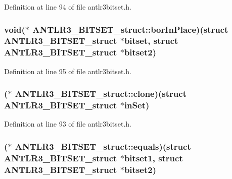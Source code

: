 Definition at line 94 of file antlr3bitset.\-h.

\hypertarget{struct_a_n_t_l_r3___b_i_t_s_e_t__struct_a4354623d1e7f563c84a8ad2c6839db25}{
\subsubsection[{bor\-In\-Place}]{\setlength{\rightskip}{0pt plus 5cm}void($\ast$ A\-N\-T\-L\-R3\-\_\-\-B\-I\-T\-S\-E\-T\-\_\-struct\-::bor\-In\-Place)(struct {\bf A\-N\-T\-L\-R3\-\_\-\-B\-I\-T\-S\-E\-T\-\_\-struct} $\ast$bitset, struct {\bf A\-N\-T\-L\-R3\-\_\-\-B\-I\-T\-S\-E\-T\-\_\-struct} $\ast$bitset2)}}\label{struct_a_n_t_l_r3___b_i_t_s_e_t__struct_a4354623d1e7f563c84a8ad2c6839db25}


Definition at line 95 of file antlr3bitset.\-h.

\hypertarget{struct_a_n_t_l_r3___b_i_t_s_e_t__struct_a2285d8dc3d04b4eae8986908897a86f4}{
\subsubsection[{clone}]{($\ast$ A\-N\-T\-L\-R3\-\_\-\-B\-I\-T\-S\-E\-T\-\_\-struct\-::clone)(struct {\bf A\-N\-T\-L\-R3\-\_\-\-B\-I\-T\-S\-E\-T\-\_\-struct} $\ast$in\-Set)}}\label{struct_a_n_t_l_r3___b_i_t_s_e_t__struct_a2285d8dc3d04b4eae8986908897a86f4}


Definition at line 93 of file antlr3bitset.\-h.

\hypertarget{struct_a_n_t_l_r3___b_i_t_s_e_t__struct_a94e3dc61f3da71dadfc19c1b31981134}{
\subsubsection[{equals}]{($\ast$ A\-N\-T\-L\-R3\-\_\-\-B\-I\-T\-S\-E\-T\-\_\-struct\-::equals)(struct {\bf A\-N\-T\-L\-R3\-\_\-\-B\-I\-T\-S\-E\-T\-\_\-struct} $\ast$bitset1, struct {\bf A\-N\-T\-L\-R3\-\_\-\-B\-I\-T\-S\-E\-T\-\_\-struct} $\ast$bitset2)}}\label{struct_a_n_t_l_r3___b_i_t_s_e_t__struct_a94e3dc61f3da71dadfc19c1b31981134}


